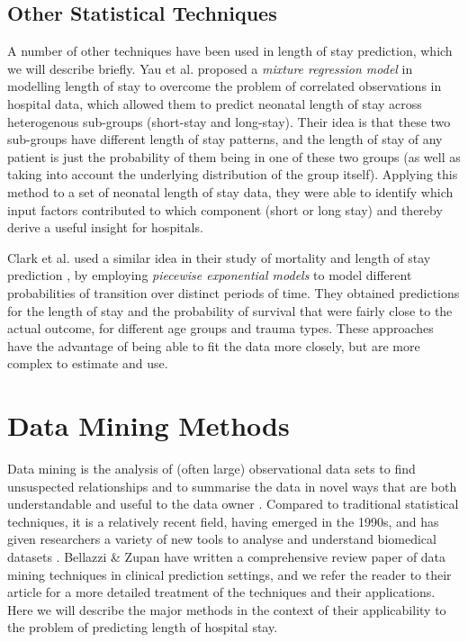 \subsection{Other Statistical Techniques}
A number of other techniques have been used in length of stay prediction, which
we will describe briefly.
Yau et al. \citep{Yau2003} proposed a \textit{mixture regression model} in
modelling
length of stay to overcome the problem of correlated observations in hospital
data, which allowed them to predict neonatal length of stay across heterogenous
sub-groups (short-stay and long-stay). Their idea is that these two sub-groups
have different length of stay patterns, and the length of stay of any patient
is just the probability of them being in one of these two groups (as well as
taking into account the underlying distribution of the group itself). Applying
this method to a set of neonatal length of stay data, they were able to
identify which input factors contributed to which component (short or long
stay) and thereby derive a useful insight for hospitals.

Clark et al. used a similar idea in their study of mortality and length of stay
prediction \citep{Clark2002}, by employing \textit{piecewise exponential models}
to model different probabilities of transition over distinct periods of time.
They obtained predictions for the length of stay and the probability of
survival that were fairly close to the actual outcome, for different age groups
and trauma types. These approaches have the advantage of being able to fit the
data more closely, but are more complex to estimate and use.

\section{Data Mining Methods}
Data mining is the analysis of (often large) observational data sets to find
unsuspected relationships and to summarise the data in novel ways that are both
understandable and useful to the data owner \citep{Hand2001}. Compared to
traditional statistical techniques, it is a relatively recent field, having
emerged in the 1990s, and has
given researchers a variety of new tools to analyse and understand biomedical
datasets \citep{Bellazzi2008,Yoo2012}. Bellazzi \& Zupan \citep{Bellazzi2008}
have written a
comprehensive review paper of data mining techniques in clinical prediction
settings, and we refer the reader to their article for a more detailed
treatment of the techniques and their applications. Here we will describe the
major methods in the context of their applicability to the problem of
predicting length of hospital stay.

